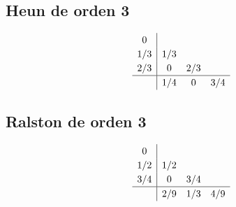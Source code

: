     \noindent\begin{minipage}[t]{.5\linewidth}
        \subsection{Heun de orden 3}
            \begin{equation}\label{eq:heun3}
                \renewcommand\arraystretch{1.2}
                \begin{array}{c|ccc}
                0\\
                1/3 & 1/3\\
                2/3 & 0 & 2/3\\
                \hline
                & 1/4 & 0 & 3/4
                \end{array}
            \end{equation}
    \end{minipage}%
    \begin{minipage}[t]{.5\linewidth}
        \subsection{Ralston de orden 3}
            \begin{equation}\label{eq:ralston3}
                \renewcommand\arraystretch{1.2}
                \begin{array}{c|ccc}
                0\\
                1/2 & 1/2\\
                3/4 & 0 & 3/4\\
                \hline
                & 2/9 & 1/3 & 4/9
                \end{array}
            \end{equation}
    \end{minipage}

    \vfill

